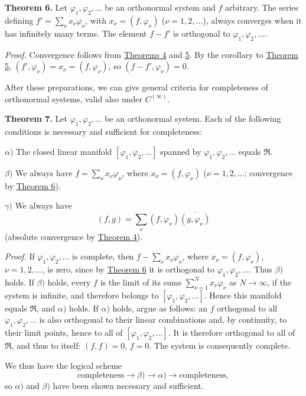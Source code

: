 \documentclass[fontsize=13pt,twoside,openany,headings=normal,parskip=false,bookmarkpackage=false,DIV=calc]{scrbook}
\begin{document}
\leavevmode{}\textbf{Theorem 6.}\label{thm:II.6} Let $\varphi_1,\varphi_2,\ldots$ be an orthonormal system and $f$ arbitrary. The series defining $f'=\sum_\nu x_\nu\varphi_\nu$, with $x_\nu=(f,\varphi_\nu)$ ($\nu=1,2,\ldots$), always converges when it has infinitely many terms. The element $f-f'$ is orthogonal to $\varphi_1,\varphi_2,\ldots$.

\emph{Proof.} Convergence follows from \hyperref[thm:II.4]{Theorems 4} and \hyperref[thm:II.5]{5}. By the corollary to \hyperref[thm:II.5]{Theorem 5}, $(f',\varphi_\nu)=x_\nu=(f,\varphi_\nu)$, so $(f-f',\varphi_\nu)=0$.

After these preparations, we can give general criteria for completeness of orthonormal systems, valid also under \hyperref[ax:II.Cinfty]{$C^{(\infty)}$}.

\leavevmode{}\textbf{Theorem 7.}\label{thm:II.7} Let $\varphi_1,\varphi_2,\ldots$ be an orthonormal system. Each of the following conditions is necessary and sufficient for completeness:

$\alpha)$ The closed linear manifold $[\varphi_1,\varphi_2,\ldots]$ spanned by $\varphi_1,\varphi_2,\ldots$ equals $\mathfrak{R}$.

$\beta)$ We always have $f=\sum_\nu x_\nu\varphi_\nu$, where $x_\nu=(f,\varphi_\nu)$ ($\nu=1,2,\ldots$; convergence by \hyperref[thm:II.6]{Theorem 6}).

$\gamma)$ We always have
\[
(f,g)=\sum_\nu(f,\varphi_\nu)\overline{(g,\varphi_\nu)}
\]
(absolute convergence by \hyperref[thm:II.4]{Theorem 4}).

\emph{Proof.} If $\varphi_1,\varphi_2,\ldots$ is complete, then $f-\sum_\nu x_\nu\varphi_\nu$, where $x_\nu=(f,\varphi_\nu)$, $\nu=1,2,\ldots$, is zero, since by \hyperref[thm:II.6]{Theorem 6} it is orthogonal to $\varphi_1,\varphi_2,\ldots$. Thus $\beta)$ holds. If $\beta)$ holds, every $f$ is the limit of its sums $\sum_{\nu=1}^Nx_\nu\varphi_\nu$ as $N\to\infty$, if the system is infinite, and therefore belongs to $[\varphi_1,\varphi_2,\ldots]$. Hence this manifold equals $\mathfrak{R}$, and $\alpha)$ holds. If $\alpha)$ holds, argue as follows: an $f$ orthogonal to all $\varphi_1,\varphi_2,\ldots$ is also orthogonal to their linear combinations and, by continuity, to their limit points, hence to all of $[\varphi_1,\varphi_2,\ldots]$. It is therefore orthogonal to all of $\mathfrak{R}$, and thus to itself: $(f,f)=0$, $f=0$. The system is consequently complete.

We thus have the logical scheme
\[
\text{completeness}\longrightarrow\beta)\longrightarrow\alpha)
\longrightarrow\text{completeness},
\]
so $\alpha)$ and $\beta)$ have been shown necessary and sufficient.
\end{document}
